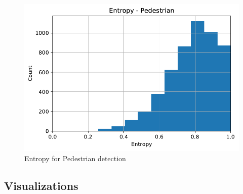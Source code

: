 \documentclass[10pt,twocolumn,letterpaper]{article}
\begin{document}
\begin{figure}[!htbp]
        \centering
		\includegraphics[scale = 0.4]{images/Part-Bayesian F_Pointnet_Results/Entropy_Pedestrian.pdf}
        \caption[Extracted frustum point cloud after Normalization]{Entropy for Pedestrian detection}
        \label{fig:Norm Point Cloud}
\end{figure}
\subsection{Visualizations}
\end{document}
